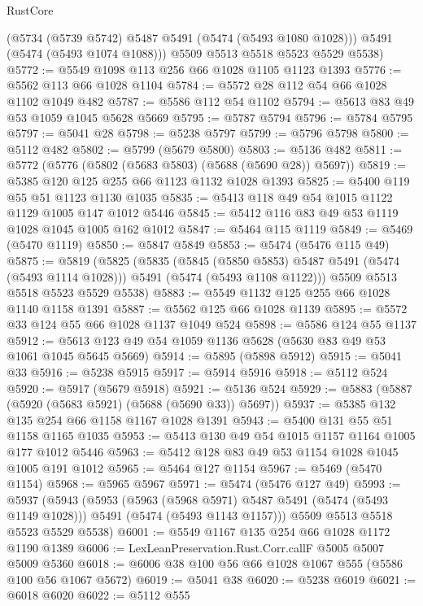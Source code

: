 \begin{lexlean}{RustCore}
\begin{coremodule}
        (@5734 (@5739 @5742) @5487 @5491 (@5474 (@5493 @1080 @1028)))
        @5491
        (@5474 (@5493 @1074 @1088)))
      @5509
      @5513
      @5518
      @5523
      @5529
      @5538)
@5772 := @5549 @1098 @113 @256 @66 @1028 @1105 @1123 @1393
@5776 := @5562 @113 @66 @1028 @1104
@5784 := @5572 @28 @112 @54 @66 @1028 @1102 @1049 @482
@5787 := @5586 @112 @54 @1102
@5794 := @5613 @83 @49 @53 @1059 @1045 @5628 @5669
@5795 := @5787 @5794
@5796 := @5784 @5795
@5797 := @5041 @28
@5798 := @5238 @5797
@5799 := @5796 @5798
@5800 := @5112 @482
@5802 := @5799 (@5679 @5800)
@5803 := @5136 @482
@5811 := @5772 (@5776 (@5802 (@5683 @5803) (@5688 (@5690 @28)) @5697))
@5819 := @5385 @120 @125 @255 @66 @1123 @1132 @1028 @1393
@5825 := @5400 @119 @55 @51 @1123 @1130 @1035
@5835 := @5413 @118 @49 @54 @1015 @1122 @1129 @1005 @147 @1012 @5446
@5845 := @5412 @116 @83 @49 @53 @1119 @1028 @1045 @1005 @162 @1012
@5847 := @5464 @115 @1119
@5849 := @5469 (@5470 @1119)
@5850 := @5847 @5849
@5853 := @5474 (@5476 @115 @49)
@5875 := @5819
    (@5825
      (@5835
        (@5845 (@5850 @5853) @5487 @5491 (@5474 (@5493 @1114 @1028)))
        @5491
        (@5474 (@5493 @1108 @1122)))
      @5509
      @5513
      @5518
      @5523
      @5529
      @5538)
@5883 := @5549 @1132 @125 @255 @66 @1028 @1140 @1158 @1391
@5887 := @5562 @125 @66 @1028 @1139
@5895 := @5572 @33 @124 @55 @66 @1028 @1137 @1049 @524
@5898 := @5586 @124 @55 @1137
@5912 := @5613 @123 @49 @54 @1059 @1136 @5628 (@5630 @83 @49 @53 @1061 @1045 @5645 @5669)
@5914 := @5895 (@5898 @5912)
@5915 := @5041 @33
@5916 := @5238 @5915
@5917 := @5914 @5916
@5918 := @5112 @524
@5920 := @5917 (@5679 @5918)
@5921 := @5136 @524
@5929 := @5883 (@5887 (@5920 (@5683 @5921) (@5688 (@5690 @33)) @5697))
@5937 := @5385 @132 @135 @254 @66 @1158 @1167 @1028 @1391
@5943 := @5400 @131 @55 @51 @1158 @1165 @1035
@5953 := @5413 @130 @49 @54 @1015 @1157 @1164 @1005 @177 @1012 @5446
@5963 := @5412 @128 @83 @49 @53 @1154 @1028 @1045 @1005 @191 @1012
@5965 := @5464 @127 @1154
@5967 := @5469 (@5470 @1154)
@5968 := @5965 @5967
@5971 := @5474 (@5476 @127 @49)
@5993 := @5937
    (@5943
      (@5953
        (@5963 (@5968 @5971) @5487 @5491 (@5474 (@5493 @1149 @1028)))
        @5491
        (@5474 (@5493 @1143 @1157)))
      @5509
      @5513
      @5518
      @5523
      @5529
      @5538)
@6001 := @5549 @1167 @135 @254 @66 @1028 @1172 @1190 @1389
@6006 := LexLeanPreservation.Rust.Corr.callF @5005 @5007 @5009 @5360
@6018 := @6006 @38 @100 @56 @66 @1028 @1067 @555 (@5586 @100 @56 @1067 @5672)
@6019 := @5041 @38
@6020 := @5238 @6019
@6021 := @6018 @6020
@6022 := @5112 @555

\end{coremodule}
\end{lexlean}
